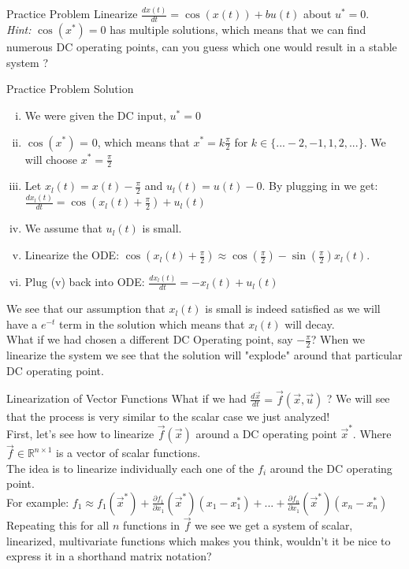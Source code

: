 \documentclass{beamer}
\newcommand{\R}{\mathbb{R}}
\begin{document}
	\begin{frame}{Practice Problem}
	Linearize $\frac{dx(t)}{dt} = \cos(x(t)) + bu(t)$ about $u^* = 0$. \pause \\
	\textit{Hint:} $\cos(x^*) = 0$ has multiple solutions, which means that we can find numerous DC operating points, can you guess which one would result in a stable system ? 
	\end{frame}
	\begin{frame}{Practice Problem Solution}
	\begin{enumerate}[(i)]
	    \item We were given the DC input, $u^* = 0$ \pause \\
	    \item $\cos(x^*)$ = 0, which means that $x^* = k\frac{\pi}{2}$ for $k \in \{...-2,-1,1,2,...\}$. We will choose $x^* = \frac{\pi}{2}$ \pause \\
	    \item Let $x_l(t) = x(t) - \frac{\pi}{2}$ and $u_l(t) = u(t) - 0$.
	    By plugging in we get: $\frac{dx_l(t)}{dt} = \cos(x_l(t) + \frac{\pi}{2}) + u_l(t)$ \pause \\
	    \item We assume that $u_l(t)$ is small.\pause \\
	    \item Linearize the ODE: $\cos(x_l(t) + \frac{\pi}{2}) \approx \cos(\frac{\pi}{2}) -\sin(\frac{\pi}{2})x_l(t)$. \pause
	    \item Plug (v) back into ODE: 
	    $\frac{dx_l(t)}{dt} = -x_l(t) + u_l(t)$ 
	\end{enumerate}
	 \pause 
	 We see that our assumption that  $x_l(t)$ is small is indeed satisfied as we will have a $e^{-t}$ term in the solution which means that $x_l(t)$ will decay.\\ \pause
	What if we had chosen a different DC Operating point, say $-\frac{\pi}{2}$? When we linearize the system we see that the solution will "explode" around that particular DC operating point.
	\end{frame}

	\begin{frame}{Linearization of Vector Functions}
	What if we had $\frac{d\vec{x}}{dt} = \vec{f}(\vec{x}, \vec{u})$ ? We will see that the process is very similar to the scalar case we just analyzed!\\ \pause
	First, let's see how to linearize $\vec{f}(\vec{x})$ around a DC operating point $\vec{x}^*$. Where $\vec{f} \in \R^{n \times 1}$ is a vector of scalar functions. \\\pause
	The idea is to linearize individually each one of the $f_i$ around the DC operating point. \\\pause
	For example: $f_1 \approx f_1(\vec{x}^*) + \frac{\partial f_1}{\partial x_1}(\vec{x}^*)(x_1 - x_1^*) + ... +  \frac{\partial f_n}{\partial x_1}(\vec{x}^*)(x_n - x_n^*)$\\\pause
	Repeating this for all $n$ functions in $\vec{f}$ we see we get a system of scalar, linearized, multivariate functions which makes you think, wouldn't it be nice to express it in a shorthand matrix notation?
	\end{frame}
\end{document}
